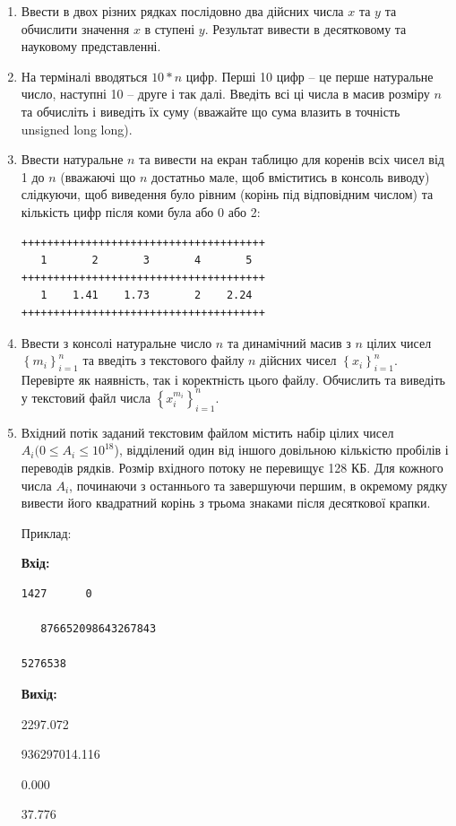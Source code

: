 \documentclass[a5paper,titlepage,openany,twoside,
]
{book_unv}%
\begin{document}
\begin{enumerate}
\def\labelenumi{\arabic{enumi})}
\item
  Ввести в двох різних рядках послідовно два дійсних числа $x$ та $y$ та
  обчислити значення $x$ в ступені $y$. Результат вивести в десятковому та
  науковому представленні.
\item
  На терміналі вводяться $10*n$ цифр. Перші 10 цифр -- це перше натуральне
  число, наступні 10 -- друге і так далі. Введіть всі ці числа в масив
  розміру $n$ та обчисліть і виведіть їх суму (вважайте що сума влазить в
  точність unsigned long long).
\item
  Ввести натуральне $n$ та вивести на екран таблицю для коренів 
 всіх чисел від 1 до $n$ (вважаючі що $n$ достатньо мале, щоб вміститись в 
 консоль виводу) слідкуючи, щоб виведення було рівним (корінь під відповідним числом)
 та кількість цифр після коми була або 0 або 2:
\begin{verbatim}
++++++++++++++++++++++++++++++++++++++
   1       2       3       4       5 
++++++++++++++++++++++++++++++++++++++
   1    1.41    1.73       2    2.24 
++++++++++++++++++++++++++++++++++++++
\end{verbatim}
\item
  Ввести з консолі натуральне число $n$ та динамічний масив з
  $n$ цілих чисел \(\left\{ m_{i} \right\}_{i = 1}^{n}\) та введіть з 
текстового файлу $n$ дійсних чисел  \(\left\{ x_{i} \right\}_{i = 1}^{n}\).
 Перевірте як наявність, так і коректність цього файлу.
 Обчислить та виведіть у текстовий файл
  числа \(\left\{ x_{i}^{m_{i}} \right\}_{i = 1}^{n}\).
\item
  Вхідний потік заданий текстовим файлом містить набір цілих чисел $A_i (0
  \le A_i \le 10^{18}$), відділений один від іншого довільною кількістю пробілів
  і переводів рядків. Розмір вхідного потоку не перевищує 128 КБ. Для
  кожного числа $A_i$, починаючи з останнього та завершуючи першим, в
  окремому рядку вивести його квадратний корінь з трьома
  знаками після десяткової крапки.

Приклад:

\textbf{Вхід:}
\begin{verbatim}
1427      0

   876652098643267843

5276538
\end{verbatim}
\textbf{Вихід: }

2297.072

936297014.116

0.000

37.776

\end{enumerate}
\end{document}
